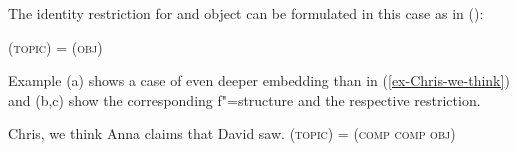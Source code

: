 \noindent
The identity restriction for \topic{} and object can be formulated in this case as in ():

\ea
\label{Topic-Obj}
(\upsp  \textsc{topic}) = (\upsp \textsc{obj})
\z

\noindent
Example (a) shows a case of even deeper embedding than in (\ref{ex-Chris-we-think}) and
(b,c) show the corresponding f"=structure and the respective restriction.

\eal
\ex Chris, we think Anna claims that David saw.
\ex 
{}
\ex\label{Topic-Comp-Comp-Obj}
(\upsp  \textsc{topic}) = (\upsp \textsc{comp comp obj})
\zl


